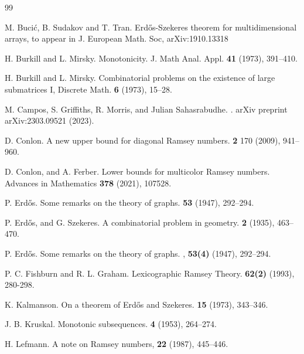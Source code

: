 \begin{thebibliography}{99}

M. Buci\'c, B. Sudakov and T. Tran. \newblock Erd\H os-Szekeres theorem for multidimensional arrays, {\newblock to appear in J. European Math. Soc}, { arXiv:1910.13318} %

H. Burkill and L. Mirsky. \newblock Monotonicity. {\newblock J. Math Anal. Appl.}  \textbf{41} (1973), 391--410.

 H. Burkill and L. Mirsky. \newblock Combinatorial problems on the existence of large submatrices I, {\newblock Discrete
Math.}  \textbf{6} (1973), 15--28.

M. Campos, S. Griffiths, R. Morris, and Julian Sahasrabudhe. . \newblock arXiv preprint arXiv:2303.09521 (2023).

D. Conlon. \newblock A new upper bound for diagonal Ramsey numbers.   \textbf{2} 170 (2009),
941--960.

D. Conlon, and A. Ferber. \newblock Lower bounds for multicolor Ramsey numbers. \newblock Advances in Mathematics \textbf{378} (2021), 107528.

P. Erd\H{o}s. \newblock Some remarks on the theory of graphs.  \textbf{53} (1947), 292--294.

P. Erd\H{o}s, and G. Szekeres. \newblock A combinatorial problem in geometry.  {\bf 2} (1935), 463--470.



P. Erd\H{o}s. \newblock Some remarks on the theory of graphs. , \textbf{53(4)} (1947), 292--294.

P. C. Fishburn and R. L. Graham. \newblock Lexicographic Ramsey Theory.  {\bf 62(2)}  (1993), 280-298.

K. Kalmanson. \newblock On a theorem of Erd\H{o}s and Szekeres.    \textbf{15} (1973), 343--346.

J. B. Kruskal. \newblock Monotonic subsequences.  \textbf{4} (1953), 264--274.

 H. Lefmann. \newblock A note on Ramsey numbers,  \textbf{22} (1987), 445--446.


\end{thebibliography}
